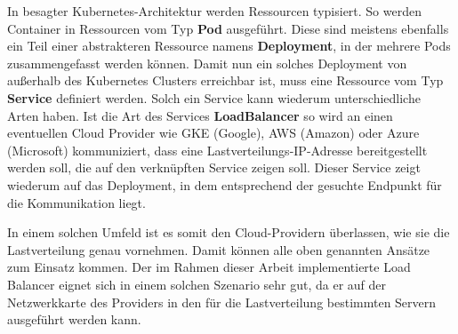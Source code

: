 In besagter Kubernetes-Architektur werden Ressourcen typisiert. So werden Container in Ressourcen vom Typ \textbf{Pod} ausgeführt. Diese sind meistens ebenfalls ein Teil einer abstrakteren Ressource namens \textbf{Deployment}, in der mehrere Pods zusammengefasst werden können. Damit nun ein solches Deployment von außerhalb des Kubernetes Clusters erreichbar ist, muss eine Ressource vom Typ \textbf{Service} definiert werden. Solch ein Service kann wiederum unterschiedliche Arten haben. Ist die Art des Services \textbf{LoadBalancer} so wird an einen eventuellen Cloud Provider wie GKE (Google), AWS (Amazon) oder Azure (Microsoft) kommuniziert, dass eine Lastverteilungs-IP-Adresse bereitgestellt werden soll, die auf den verknüpften Service zeigen soll. Dieser Service zeigt wiederum auf das Deployment, in dem entsprechend der gesuchte Endpunkt für die Kommunikation liegt. 

In einem solchen Umfeld ist es somit den Cloud-Providern überlassen, wie sie die Lastverteilung genau vornehmen. Damit können alle oben genannten Ansätze zum Einsatz kommen. Der im Rahmen dieser Arbeit implementierte Load Balancer eignet sich in einem solchen Szenario sehr gut, da er auf der Netzwerkkarte des Providers in den für die Lastverteilung bestimmten Servern ausgeführt werden kann.